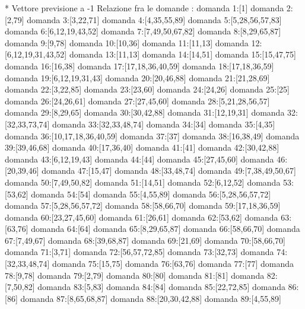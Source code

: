 * Vettore previsione a -1
Relazione fra le domande :
domanda 1:[1]
domanda 2:[2,79]
domanda 3:[3,22,71]
domanda 4:[4,35,55,89]
domanda 5:[5,28,56,57,83]
domanda 6:[6,12,19,43,52]
domanda 7:[7,49,50,67,82]
domanda 8:[8,29,65,87]
domanda 9:[9,78]
domanda 10:[10,36]
domanda 11:[11,13]
domanda 12:[6,12,19,31,43,52]
domanda 13:[11,13]
domanda 14:[14,51]
domanda 15:[15,47,75]
domanda 16:[16,38]
domanda 17:[17,18,36,40,59]
domanda 18:[17,18,36,59]
domanda 19:[6,12,19,31,43]
domanda 20:[20,46,88]
domanda 21:[21,28,69]
domanda 22:[3,22,85]
domanda 23:[23,60]
domanda 24:[24,26]
domanda 25:[25]
domanda 26:[24,26,61]
domanda 27:[27,45,60]
domanda 28:[5,21,28,56,57]
domanda 29:[8,29,65]
domanda 30:[30,42,88]
domanda 31:[12,19,31]
domanda 32:[32,33,73,74]
domanda 33:[32,33,48,74]
domanda 34:[34]
domanda 35:[4,35]
domanda 36:[10,17,18,36,40,59]
domanda 37:[37]
domanda 38:[16,38,49]
domanda 39:[39,46,68]
domanda 40:[17,36,40]
domanda 41:[41]
domanda 42:[30,42,88]
domanda 43:[6,12,19,43]
domanda 44:[44]
domanda 45:[27,45,60]
domanda 46:[20,39,46]
domanda 47:[15,47]
domanda 48:[33,48,74]
domanda 49:[7,38,49,50,67]
domanda 50:[7,49,50,82]
domanda 51:[14,51]
domanda 52:[6,12,52]
domanda 53:[53,62]
domanda 54:[54]
domanda 55:[4,55,89]
domanda 56:[5,28,56,57,72]
domanda 57:[5,28,56,57,72]
domanda 58:[58,66,70]
domanda 59:[17,18,36,59]
domanda 60:[23,27,45,60]
domanda 61:[26,61]
domanda 62:[53,62]
domanda 63:[63,76]
domanda 64:[64]
domanda 65:[8,29,65,87]
domanda 66:[58,66,70]
domanda 67:[7,49,67]
domanda 68:[39,68,87]
domanda 69:[21,69]
domanda 70:[58,66,70]
domanda 71:[3,71]
domanda 72:[56,57,72,85]
domanda 73:[32,73]
domanda 74:[32,33,48,74]
domanda 75:[15,75]
domanda 76:[63,76]
domanda 77:[77]
domanda 78:[9,78]
domanda 79:[2,79]
domanda 80:[80]
domanda 81:[81]
domanda 82:[7,50,82]
domanda 83:[5,83]
domanda 84:[84]
domanda 85:[22,72,85]
domanda 86:[86]
domanda 87:[8,65,68,87]
domanda 88:[20,30,42,88]
domanda 89:[4,55,89]

